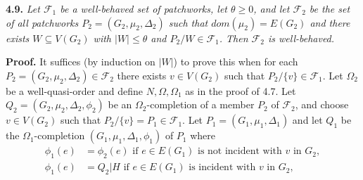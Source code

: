 \textbf{4.9.} \textit{Let $\mathcal{F}_1$ be a well-behaved set of patchworks, let $\theta \ge 0$, and let $\mathcal{F}_2$ be the set of all patchworks $P_2 = (G_2, \mu_2, \Delta_2)$ such that $dom(\mu_2) = E(G_2)$ and there exists $W \subseteq V(G_2)$ with $|W| \le \theta$ and $P_2/W \in \mathcal{F}_1$. Then $\mathcal{F}_2$ is well-behaved.}

\textbf{Proof.} It suffices (by induction on $|W|$) to prove this when for each $P_2 = (G_2, \mu_2, \Delta_2) \in \mathcal{F}_2$ there exists $v \in V(G_2)$ such that $P_2/\{v\} \in \mathcal{F}_1$. Let $\Omega_2$ be a well-quasi-order and define $N, \Omega, \Omega_1$ as in the proof of 4.7. Let $Q_2 = (G_2, \mu_2, \Delta_2, \phi_2)$ be an $\Omega_2$-completion of a member $P_2$ of $\mathcal{F}_2$, and choose $v \in V(G_2)$ such that $P_2/\{v\} = P_1 \in \mathcal{F}_1$. Let $P_1 = (G_1, \mu_1, \Delta_1)$ and let $Q_1$ be the $\Omega_1$-completion $(G_1, \mu_1, \Delta_1, \phi_1)$ of $P_1$ where
\begin{align*}
\phi_1(e) &= \phi_2(e) \text{ if } e \in E(G_1) \text{ is not incident with } v \text{ in } G_2, \\
\phi_1(e) &= Q_2|H \text{ if } e \in E(G_1) \text{ is incident with } v \text{ in } G_2,
\end{align*}
